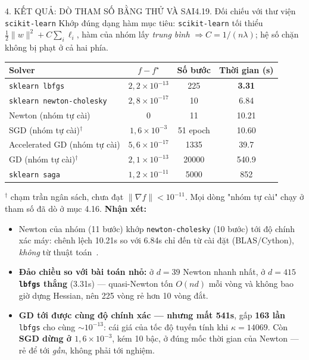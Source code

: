 \documentclass[aspectratio=169,11pt]{beamer}
\newcommand{\nx}{\textbf{Nhận xét:}}
\newcommand{\norm}[1]{\lVert #1 \rVert}
\begin{document}
\begin{frame}{4. KẾT QUẢ: DÒ THAM SỐ BẰNG THỬ VÀ SAI}{4.19. Đối chiếu với thư viện \texttt{scikit-learn}}
  \scriptsize
  Khớp đúng dạng hàm mục tiêu: \texttt{scikit-learn} tối thiểu $\tfrac12\norm{w}^2+C\sum_i\ell_i$,
  hàm của nhóm lấy \emph{trung bình} $\Rightarrow C=1/(n\lambda)$; hệ số chặn không bị phạt ở cả
  hai phía.
  \begin{center}\scriptsize
  \begin{tabular}{lccc}
    \toprule
    Solver & $f-f^\star$ & Số bước & Thời gian (s)\\
    \midrule
    \texttt{sklearn lbfgs}           & $2{,}2\times10^{-13}$ & \num{225}   & \textbf{\num{3.31}}\\
    \texttt{sklearn newton-cholesky} & $2{,}8\times10^{-17}$ & \num{10}    & \num{6.84}\\
    Newton (nhóm tự cài)             & $0$                   & \num{11}    & \num{10.21}\\
    SGD (nhóm tự cài)$^\dagger$      & $1{,}6\times10^{-3}$  & 51 epoch    & \num{10.60}\\
    Accelerated GD (nhóm tự cài)     & $5{,}6\times10^{-17}$ & \num{1335}  & \num{39.7}\\
    GD (nhóm tự cài)$^\dagger$       & $2{,}1\times10^{-13}$ & \num{20000} & \num{540.9}\\
    \texttt{sklearn saga}            & $1{,}2\times10^{-11}$ & \num{5000}  & \num{852}\\
    \bottomrule
  \end{tabular}
  \end{center}
  {\scriptsize $^\dagger$ chạm trần ngân sách, chưa đạt $\norm{\nabla f}<10^{-11}$. Mọi dòng
  "nhóm tự cài" chạy ở tham số đã dò ở mục 4.16.}
  {\scriptsize\nx{}}
  \begin{itemize}\scriptsize\itemsep=1pt
    \item Newton của nhóm (11 bước) khớp \texttt{newton-cholesky} (10 bước) tới độ chính xác máy:
          chênh lệch \num{10.21}s so với \num{6.84}s chỉ đến từ cài đặt (BLAS/Cython),
          \emph{không} từ thuật toán~\cite{sklearn}.
    \item \textbf{Đảo chiều so với bài toán nhỏ:} ở $d=39$ Newton nhanh nhất, ở $d=415$
          \textbf{\texttt{lbfgs} thắng} (\num{3.31}s) --- quasi-Newton tốn $O(nd)$ mỗi vòng và
          không bao giờ dựng Hessian, nên 225 vòng rẻ hơn 10 vòng đắt.
    \item \textbf{GD tới được cùng độ chính xác --- nhưng mất \num{541}s}, gấp \textbf{163 lần}
          \texttt{lbfgs} cho cùng $\sim$$10^{-13}$: cái giá của tốc độ tuyến tính khi
          $\kappa=\num{14069}$. Còn \textbf{SGD dừng ở $1{,}6\times10^{-3}$}, kém 10 bậc, ở đúng mốc thời
          gian của Newton --- rẻ để tới \emph{gần}, không phải tới nghiệm.
  \end{itemize}
\end{frame}
\end{document}

